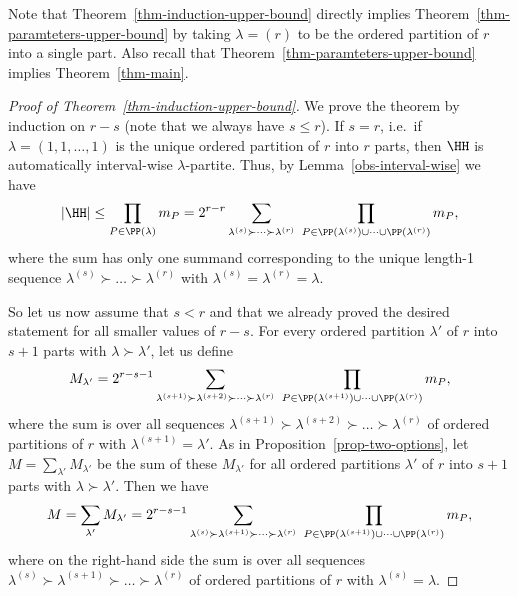 Note that Theorem~\ref{thm-induction-upper-bound} directly implies Theorem~\ref{thm-paramteters-upper-bound} by taking $\lambda=(r)$ to be the ordered partition of $r$ into a single part. Also recall that Theorem~\ref{thm-paramteters-upper-bound} implies Theorem~\ref{thm-main}.

\begin{proof}[Proof of Theorem~\ref{thm-induction-upper-bound}]
    We prove the theorem by induction on $r-s$ (note that we always have $s\le r$). If $s=r$, i.e.\ if $\lambda=(1,1,\dots,1)$ is the unique ordered partition of $r$ into $r$ parts, then $\HH$ is automatically interval-wise $\lambda$-partite. Thus, by Lemma~\ref{obs-interval-wise} we have
    \[|\HH|\le \prod_{P\in \PP(\lambda)} m_{P}=2^{r-r} \sum_{\lambda^{(s)} \succ \dots \succ \lambda^{(r)}}\  \prod_{P\in \PP(\lambda^{(s)})\cup\dots\cup \PP(\lambda^{(r)})} m_{P},\]
    where the sum has only one summand corresponding to the unique length-1 sequence $\lambda^{(s)} \succ \dots \succ \lambda^{(r)}$ with $\lambda^{(s)}=\lambda^{(r)}=\lambda$.

    So let us now assume that $s<r$ and that we already proved the desired statement for all smaller values of $r-s$.  For every ordered partition $\lambda'$ of $r$ into $s+1$ parts with $\lambda\succ\lambda'$, let us define
    \[M_{\lambda'}=2^{r-s-1} \sum_{\lambda^{(s+1)} \succ \lambda^{(s+2)} \succ \dots \succ \lambda^{(r)}}\ \prod_{P\in \PP(\lambda^{(s+1)})\cup\dots\cup \PP(\lambda^{(r)})} m_{P},\]
    where the sum is over all sequences $\lambda^{(s+1)} \succ \lambda^{(s+2)} \succ \dots \succ \lambda^{(r)}$ of ordered partitions of $r$ with $\lambda^{(s+1)}=\lambda'$. As in Proposition~\ref{prop-two-options}, let $M=\sum_{\lambda'}M_{\lambda'}$ be the sum of these $M_{\lambda'}$ for all ordered partitions $\lambda'$ of $r$ into $s+1$ parts with $\lambda\succ\lambda'$. Then we have
    \[M=\sum_{\lambda'} M_{\lambda'}=2^{r-s-1} \sum_{\lambda^{(s)}\succ \lambda^{(s+1)}\succ \dots \succ \lambda^{(r)}}\ \prod_{ P\in \PP(\lambda^{(s+1)})\cup\dots\cup \PP(\lambda^{(r)}) } m_{P},\]
    where on the right-hand side the sum is over all sequences $\lambda^{(s)} \succ \lambda^{(s+1)} \succ \dots \succ \lambda^{(r)}$ of ordered partitions of $r$ with $\lambda^{(s)}=\lambda$.


\end{proof}
